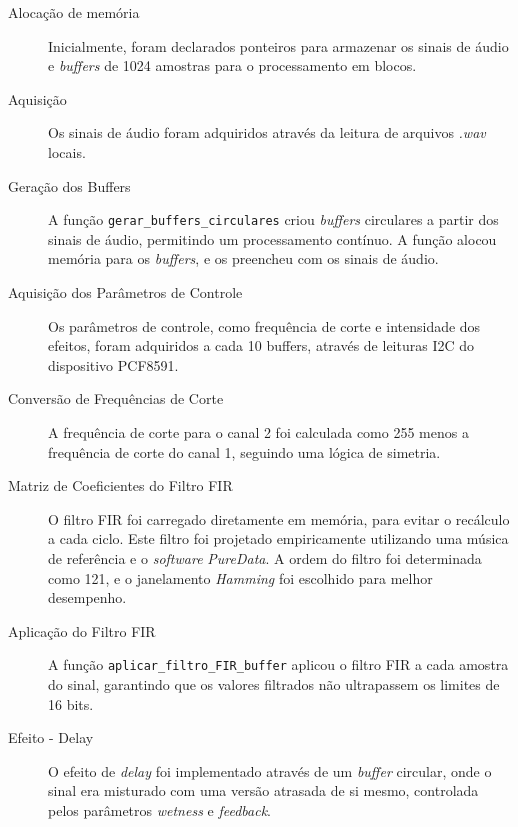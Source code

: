 \begin{description}

\item[Alocação de memória] Inicialmente, foram declarados ponteiros para armazenar os sinais de áudio e \textit{buffers} de 1024 amostras para o processamento em blocos.

\item [Aquisição] Os sinais de áudio foram adquiridos através da leitura de arquivos \textit{.wav} locais.

\item [Geração dos Buffers]

A função \verb|gerar_buffers_circulares| criou \textit{buffers} circulares a partir dos sinais de áudio, permitindo um processamento contínuo. A função alocou memória para os \textit{buffers}, e os preencheu com os sinais de áudio.

\item [Aquisição dos Parâmetros de Controle]

Os parâmetros de controle, como frequência de corte e intensidade dos efeitos, foram adquiridos a cada 10 buffers, através de leituras I2C do dispositivo PCF8591.

\item [Conversão de Frequências de Corte]

A frequência de corte para o canal 2 foi calculada como 255 menos a frequência de corte do canal 1, seguindo uma lógica de simetria.
\item [Matriz de Coeficientes do Filtro FIR]

O filtro FIR foi carregado diretamente em memória, para evitar o recálculo a cada ciclo. Este filtro foi projetado empiricamente utilizando uma música de referência e o \textit{software} \textit{PureData}. A ordem do filtro foi determinada como 121, e o janelamento \textit{Hamming} foi escolhido para melhor desempenho.


\item [Aplicação do Filtro FIR]

A função \verb|aplicar_filtro_FIR_buffer| aplicou o filtro FIR a cada amostra do sinal, garantindo que os valores filtrados não ultrapassem os limites de 16 bits.

\item [Efeito - Delay]

O efeito de \textit{delay} foi implementado através de um \textit{buffer} circular, onde o sinal era misturado com uma versão atrasada de si mesmo, controlada pelos parâmetros \textit{wetness} e \textit{feedback}.


\end{description}
